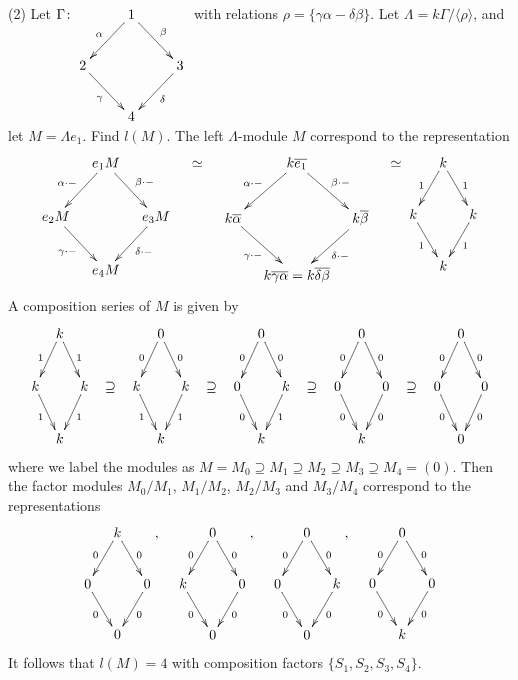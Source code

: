 \begin{exam}
(2) Let $\Gamma\colon \xymatrix{ & 1\ar[dl]_\alpha \ar[dr]^\beta & \\
  2\ar[dr]_\gamma & & 3\ar[dl]^\delta \\
& 4 & }$ with relations $\rho = \{ \gamma\alpha - \delta\beta\}$.  Let
$\Lambda = k\Gamma/\langle \rho\rangle$, and let $M = \Lambda e_1$.
Find $l(M)$. The left $\Lambda$-module $M$ correspond to the
representation 
\[\xymatrix@C=10pt{ & e_1M\ar[dl]_{\alpha\cdot-} \ar[dr]^{\beta\cdot-} & \\
  e_2M\ar[dr]_{\gamma\cdot -} & & e_3M\ar[dl]^{\delta\cdot - } \\
& e_4M & }  \quad \simeq \quad 
\xymatrix@C=10pt{ & k\overline{e_1} \ar[dl]_{\alpha\cdot-} \ar[dr]^{\beta\cdot-} & \\
  k\overline{\alpha}\ar[dr]_{\gamma\cdot -} & & k\overline{\beta}\ar[dl]^{\delta\cdot - } \\
& k\overline{\gamma\alpha} = k\overline{\delta\beta} & } 
\quad \simeq \xymatrix@C=10pt{ & k\ar[dl]_{1} \ar[dr]^{1} & \\
  k\ar[dr]_{1} & & k\ar[dl]^{1} \\
& k & } 
\]
A composition series of $M$ is given by 
\[\xymatrix@C=6pt{
& k\ar[dl]_{1} \ar[dr]^{1} &     &                  & & 0\ar[dl]_{0}
\ar[dr]^{0} &     &                  & & 0\ar[dl]_{0} \ar[dr]^{0} &
&                  && 0\ar[dl]_{0} \ar[dr]^{0} &   & &  &  0\ar[dl]_{0}
\ar[dr]^{0} &  \\
k\ar[dr]_{1} & & k\ar[dl]^{1} & \supseteq & k\ar[dr]_{1} & &
k\ar[dl]^{1} & \supseteq & 0\ar[dr]_{0} & & k\ar[dl]^{1} & \supseteq &
0\ar[dr]_{0} & & 0\ar[dl]^{0} & \supseteq & 0\ar[dr]_{0} & & 0\ar[dl]^{0} \\
& k &                                    &                 & & k &
&                 & & k &                                    &
& & k &  & & & 0 & 
}\]
where we label the modules as $M = M_0 \supseteq M_1 \supseteq M_2
\supseteq M_3 \supseteq M_4 = (0)$. Then the factor modules $M_0/M_1$,
$M_1/M_2$, $M_2/M_3$ and $M_3/M_4$ correspond to the representations 
\[
\xymatrix@C=10pt{ & k\ar[dl]_{0} \ar[dr]^{0} & \\
  0\ar[dr]_{0} & & 0\ar[dl]^{0} \\
& 0 & }, \quad 
\xymatrix@C=10pt{ & 0\ar[dl]_{0} \ar[dr]^{0} & \\
  k\ar[dr]_{0} & & 0\ar[dl]^{0} \\
& 0 & }, \quad 
\xymatrix@C=10pt{ & 0\ar[dl]_{0} \ar[dr]^{0} & \\
  0\ar[dr]_{0} & & k\ar[dl]^{0} \\
& 0 & }, \quad 
\xymatrix@C=10pt{ & 0\ar[dl]_{0} \ar[dr]^{0} & \\
  0\ar[dr]_{0} & & 0\ar[dl]^{0} \\
& k & }
\]
It follows that $l(M) = 4$ with composition factors
$\{S_1,S_2,S_3,S_4\}$. 
\end{exam}

